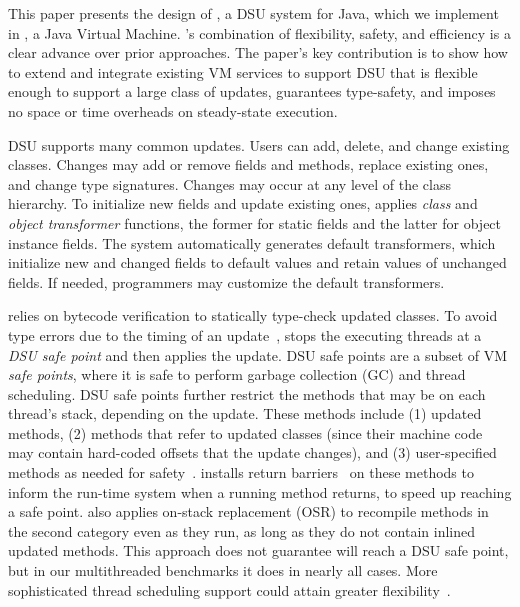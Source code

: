 This paper presents the design of \DSU, a DSU system for Java, which
we implement in \JikesRVM, a Java Virtual Machine. \DSU's combination
of flexibility, safety, and efficiency is a clear advance over prior
approaches.  The 
paper's key contribution is to show how to extend and integrate
existing VM services to support DSU that is flexible enough to support
a large class of updates, guarantees type-safety, and imposes no space
or time overheads on steady-state execution.

\DSU{} DSU supports many common updates. Users can add, delete, and
change existing classes.  Changes may add or remove fields and methods,
replace existing ones, and change type signatures.  Changes may occur
at any level of the class hierarchy.  To initialize new fields and
update existing ones, \DSU{} applies \emph{class} and \emph{object
  transformer} functions, the former for static fields and the latter
for object instance fields.  The system automatically generates
default transformers, which initialize new and changed fields to
default values and retain values of unchanged fields.  If needed,
programmers may customize the default transformers.

\DSU{} relies on bytecode verification to statically type-check
updated classes.  To avoid type errors due to the timing of an
update~\cite{StoyleHBSN06,neamtiu06dsu,k42usenix}, \DSU{} stops the executing
threads at a \emph{DSU safe point} and then applies the update. DSU
safe points are a subset of VM \emph{safe points}, where it is safe to perform garbage collection (GC) and thread scheduling.  DSU safe points further
restrict the methods that may be on each thread's stack, depending on
the update.  These methods include (1) updated methods,
(2) methods that refer to updated classes (since their machine code 
may contain hard-coded offsets that the update changes), and (3) user-specified methods
as needed for safety~\cite{Gupta94,neamtiu08context}.  \DSU{} installs return
barriers~\cite{return-barrier} on these methods to inform the run-time system when
a running method returns, to speed up reaching a safe point.  \DSU{}
also applies on-stack replacement (OSR) to recompile methods in the
second category even as they run, as long as they do not contain inlined
updated methods.  This approach does not guarantee \DSU{} will reach a DSU safe point, but in our
multithreaded benchmarks it does in nearly all cases. More sophisticated
thread scheduling support could attain greater
flexibility~\cite{neamtiu09stump}. 

